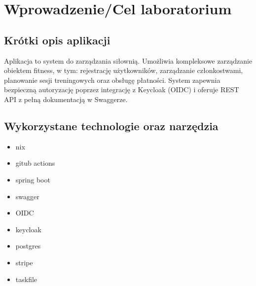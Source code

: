 \documentclass[../../spr.tex]{subfiles}
\begin{document}
\section{Wprowadzenie/Cel laboratorium}

\subsection{Krótki opis aplikacji}
Aplikacja to system do zarządzania siłownią.
Umożliwia kompleksowe zarządzanie obiektem fitness, 
w tym: rejestrację użytkowników, zarządzanie członkostwami, 
planowanie sesji treningowych oraz obsługę płatności. 
System zapewnia bezpieczną autoryzację poprzez integrację z Keycloak (OIDC) 
i oferuje REST API z pełną dokumentacją w Swaggerze.
\subsection{Wykorzystane technologie oraz narzędzia}

\begin{multicols}{3}
  \begin{itemize}
    \item nix
    \item gitub actions
    \item spring boot
    \item swagger
    \item OIDC
    \item keycloak
    \item postgres
    \item stripe
    \item taskfile
  \end{itemize}
\end{multicols}
\end{document}
